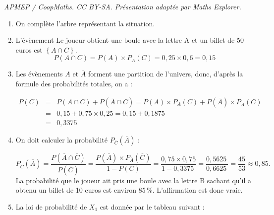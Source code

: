 \documentclass[10pt]{article}
\providecommand{\np}[2][]{{#2~#1}}
\begin{document}
\noindent\textit{APMEP / CoopMaths. CC BY-SA. Présentation adaptée par Maths Explorer.}\par\medskip
\smallskip

\begin{enumerate}
\item On complète l'arbre représentant la situation.

\begin{center}
\medskip
{}
\medskip		
\end{center}

	\item L'évènement \og Le joueur obtient une boule avec la lettre A et un billet de 50 euros \fg{} est $\left\{A \cap C\right\}$.
	\[P\left(A \cap C\right) = P(A) \times P_{A}(C) = 0,25 \times 0,6 = \boxed{0,15}\]

	\item Les évènements $A$ et $\overline{A}$ forment une partition de l'univers, donc, d'après la formule des probabilités totales, on a :
	
\begin{eqnarray*}
P(C)&=& P\left(A \cap C\right) + P\left(\overline{A} \cap C\right) = P(A) \times P_{A}(C) + P\left(\overline{A}\right) \times P_{\overline{A}}(C)\\
	&=& 0,15 + 0,75 \times 0,25 = 0,15 + \np{0,1875}\\
	&=& \boxed{\np{0,3375}}
\end{eqnarray*}

	\item On doit calculer la probabilité $P_{\overline{C}}\left(\overline{A}\right)$ :

	\[P_{\overline{C}}\left(\overline{A}\right) = \dfrac{P\left(\overline{A}\cap \overline{C}\right)}{P\left(\overline{C}\right)} = \dfrac{P\left(\overline{A}\right) \times P_{\overline{A}}\left(\overline{C}\right)}{1 - P(C)} = \dfrac{0,75 \times 0,75}{1 - \np{0,3375}} = \dfrac{\np{0,5625}}{\np{0,6625}} = \dfrac{45}{53} \approx 0,85.\]
La probabilité que le joueur ait pris une boule avec la lettre B sachant qu'il a obtenu un billet de 10 euros est environ 85\,\%. L'affirmation est donc vraie.

	\item La loi de probabilité de $X_{1}$ est donnée par le tableau suivant :


\end{enumerate}
\end{document}
